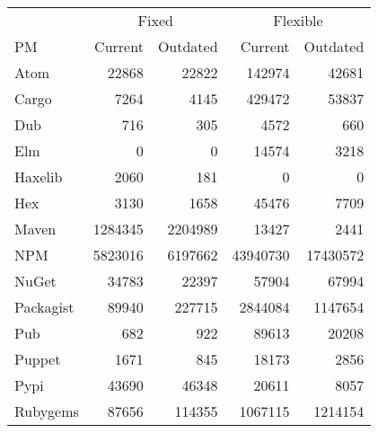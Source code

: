 \begin{tabular}{|l|rr|rr|}
\hline
& \multicolumn{2}{c|}{Fixed} & \multicolumn{2}{c|}{Flexible} \\
PM & Current & Outdated & Current & Outdated \\
\hline
Atom & 22868 & 22822 & 142974 & 42681 \\
Cargo & 7264 & 4145 & 429472 & 53837 \\
Dub & 716 & 305 & 4572 & 660 \\
Elm & 0 & 0 & 14574 & 3218 \\
Haxelib & 2060 & 181 & 0 & 0 \\
Hex & 3130 & 1658 & 45476 & 7709 \\
Maven & 1284345 & 2204989 & 13427 & 2441 \\
NPM & 5823016 & 6197662 & 43940730 & 17430572 \\
NuGet & 34783 & 22397 & 57904 & 67994 \\
Packagist & 89940 & 227715 & 2844084 & 1147654 \\
Pub & 682 & 922 & 89613 & 20208 \\
Puppet & 1671 & 845 & 18173 & 2856 \\
Pypi & 43690 & 46348 & 20611 & 8057 \\
Rubygems & 87656 & 114355 & 1067115 & 1214154 \\
\hline
\end{tabular}
